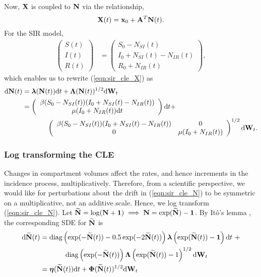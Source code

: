 Now, $ \mathbf{X} $ is coupled to $ \mathbf{N} $ via the relationship,
\begin{equation}
\label{eqn:incid2prev}
\mathbf{X}(t) = \mathbf{x}_0 + \mathbf{A}^T\mathbf{N}(t).
\end{equation}
For the SIR model, 
\begin{align}
\left (\begin{array}{c}
S(t) \\
I(t) \\
R(t)
\end{array}\right ) &= \left (\begin{array}{c}
S_0 - N_{SI}(t) \\
I_0 + N_{SI}(t) - N_{IR}(t) \\
R_0 + N_{IR}(t)
\end{array}\right ),
\end{align}
which enables us to rewrite (\ref{eqn:sir_cle_X}) as
\begin{align}\small
\label{eqn:sir_cle_N}
 \mathrm{d}\mathbf{N}(t)&= \boldsymbol{\lambda}(\mathbf{N}(t))\mathrm{d} t + \boldsymbol{\Lambda}(\mathbf{N}(t))^{1/2}\mathrm{d}\mathbf{W}_t \\
 &= \left (\begin{array}{cc}
\beta (S_0 - N_{SI}(t))(I_0 + N_{SI}(t) - N_{IR}(t))\\
\mu(I_0 + N_{IR}(t))\mathrm{d} t 
\end{array}\right )\mathrm{d} t + \nonumber\\
&\hspace{0.5in}\left(\begin{array}{cc}
\beta (S_0 - N_{SI}(t))(I_0 + N_{SI}(t) - N_{IR}(t)) & 0 \\
0 & \mu(I_0 + N_{IR}(t))
\end{array}\right)^{1/2}\mathrm{d}\mathbf{W}_t. \nonumber 
\end{align}

\subsubsection{Log transforming the CLE}
\label{subsubsec:log_cle}
Changes in compartment volumes affect the rates, and hence increments in the incidence process, multiplicatively. Therefore, from a scientific perspective, we would like for perturbations about the drift in (\ref{eqn:sir_cle_N}) to be symmetric on a multiplicative, not an additive scale. Hence, we log transform (\ref{eqn:sir_cle_N}). Let $ \widetilde{\mathbf{N}} = \log(\mathbf{N} + \boldsymbol{1}) \implies\mathbf{N} = \exp(\widetilde{\mathbf{N}}) - \boldsymbol{1}$. By It\^{o}'s lemma \cite{oksendal2003stochastic}, the corresponding SDE for $ \widetilde{\mathbf{N}} $ is 
	\begin{align}
\label{eqn:sir_log_cle}
\mathrm{d}\widetilde{\mathbf{N}}(t) &= \mathrm{diag}\left (\exp(-\widetilde{\mathbf{N}}(t)) - 0.5\exp(-2\widetilde{\mathbf{N}}(t))\right )\boldsymbol{\lambda}\left (\exp(\widetilde{\mathbf{N}}(t))-\boldsymbol{1}\right )\mathrm{d} t\ + \nonumber\\
& \hspace{0.5in} \mathrm{diag}\left (\exp(-\widetilde{\mathbf{N}}(t))\right )\boldsymbol{\Lambda}\left (\exp(\widetilde{\mathbf{N}}(t))-1\right )^{1/2}\mathrm{d}\mathbf{W}_t \\
\label{eqn:sir_log_cle_gen}
&= \boldsymbol{\eta}(\widetilde{\mathbf{N}}(t))\mathrm{d} t + \boldsymbol{\Phi}(\widetilde{\mathbf{N}}(t))^{1/2}\mathrm{d}\mathbf{W}_t
\end{align}

